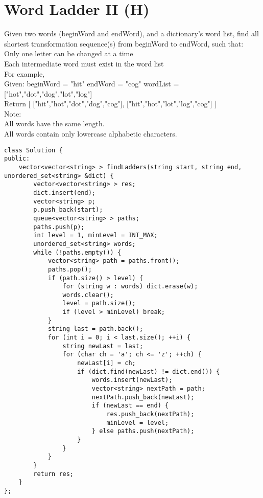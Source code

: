 \section{Word Ladder II (H)}
Given two words (beginWord and endWord), and a dictionary's word list, find all shortest transformation sequence(s) from beginWord to endWord, such that:\\
    Only one letter can be changed at a time\\
    Each intermediate word must exist in the word list\\

For example,\\
Given:
beginWord = "hit"
endWord = "cog"
wordList = ["hot","dot","dog","lot","log"]\\

Return
  [
    ["hit","hot","dot","dog","cog"],
    ["hit","hot","lot","log","cog"]
  ]\\

Note:\\
    All words have the same length.\\
    All words contain only lowercase alphabetic characters.\\

\begin{lstlisting}
class Solution {
public:
    vector<vector<string> > findLadders(string start, string end, unordered_set<string> &dict) {
        vector<vector<string> > res;
        dict.insert(end);
        vector<string> p;
        p.push_back(start);
        queue<vector<string> > paths;
        paths.push(p);
        int level = 1, minLevel = INT_MAX;
        unordered_set<string> words;
        while (!paths.empty()) {
            vector<string> path = paths.front();
            paths.pop();
            if (path.size() > level) {
                for (string w : words) dict.erase(w);
                words.clear();
                level = path.size();
                if (level > minLevel) break;
            }
            string last = path.back();
            for (int i = 0; i < last.size(); ++i) {
                string newLast = last;
                for (char ch = 'a'; ch <= 'z'; ++ch) {
                    newLast[i] = ch;
                    if (dict.find(newLast) != dict.end()) {
                        words.insert(newLast);
                        vector<string> nextPath = path;
                        nextPath.push_back(newLast);
                        if (newLast == end) {
                            res.push_back(nextPath);
                            minLevel = level;
                        } else paths.push(nextPath);
                    }
                }
            }            
        }
        return res;
    }
};
\end{lstlisting}


